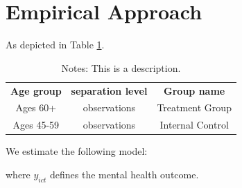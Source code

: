 \section{Empirical Approach}\label{section-methods}

As depicted in Table \ref{tab:internalcontrol}. 

\begin{table}[htp!]
\centering
\caption{Treatment and Internal Control Group in NRPS setting}
\begin{tabular}{|c|c|c}
\textbf{Age group}  & \textbf{separation level}     & \textbf{Group name}  \\
Ages 60+      & observations & Treatment Group \\
Ages 45-59    & observations & Internal Control  %
\end{tabular}
\caption*{Notes: This is a description.}
\label{tab:internalcontrol}
\end{table}





We estimate the following model:
\begin{equation}
 
\end{equation}

where $y_{ict}$ defines the mental health outcome.








